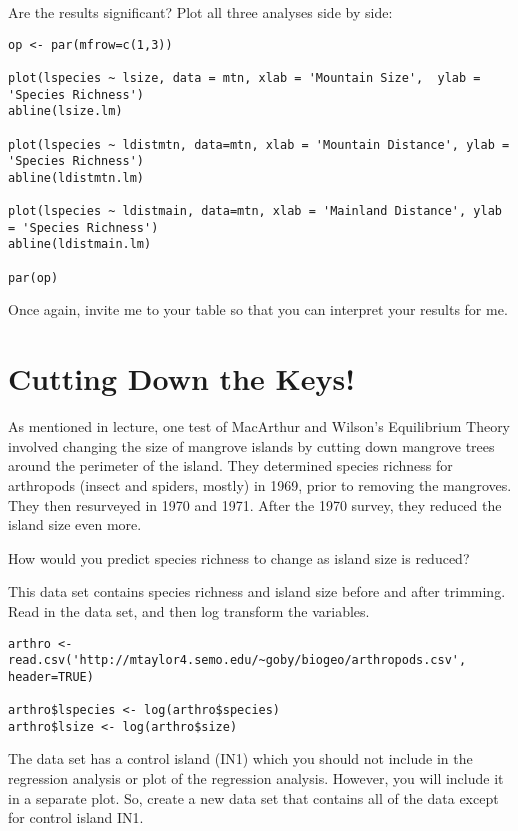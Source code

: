 \documentclass[11pt]{article}
\begin{document}
Are the results significant?  Plot all three analyses side by side:

\begin{verbatim}
op <- par(mfrow=c(1,3))

plot(lspecies ~ lsize, data = mtn, xlab = 'Mountain Size',  ylab = 'Species Richness')
abline(lsize.lm)

plot(lspecies ~ ldistmtn, data=mtn, xlab = 'Mountain Distance', ylab = 'Species Richness')
abline(ldistmtn.lm)

plot(lspecies ~ ldistmain, data=mtn, xlab = 'Mainland Distance', ylab = 'Species Richness')
abline(ldistmain.lm)

par(op)
\end{verbatim}

Once again, invite me to your table so that you can interpret your results for me.

\section{Cutting Down the Keys!}

As mentioned in lecture, one test of MacArthur and Wilson's Equilibrium Theory involved changing the size of mangrove islands by cutting down mangrove trees around the perimeter of the island.  They determined species richness for arthropods (insect and spiders, mostly) in 1969, prior to removing the mangroves. They then resurveyed in 1970 and 1971.  After the 1970 survey, they reduced the island size even more. 

How would you predict species richness to change as island size is reduced?

This data set contains species richness and island size before and after trimming.  Read in the data set, and then log transform the variables.

\begin{verbatim}
arthro <- read.csv('http://mtaylor4.semo.edu/~goby/biogeo/arthropods.csv', header=TRUE)

arthro$lspecies <- log(arthro$species)
arthro$lsize <- log(arthro$size)

\end{verbatim}

The data set has a control island (IN1) which you should not include in the regression analysis or plot of the regression analysis.  However, you will include it in a separate plot.  So,  create a new data set that contains all of the data except for control island IN1.
\end{document}
